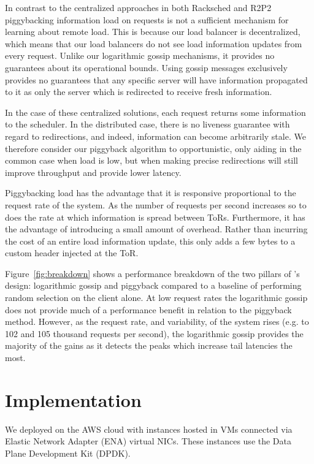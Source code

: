 In contrast to the centralized approaches in both Racksched and
R2P2~\cite{racksched, r2p2} piggybacking information load on requests
is not a sufficient mechanism for learning about remote load. This is
because our load balancer is decentralized, which means that our load
balancers do not see load information updates from every request.
Unlike our logarithmic gossip mechanisms, it provides no guarantees
about its operational bounds. Using gossip messages exclusively
provides no guarantees that any specific server will have information
propagated to it as only the server which is redirected to receive
fresh information.

In the case of these centralized solutions, each request returns some
information to the scheduler. In the distributed case, there is no liveness
guarantee with regard to redirections, and indeed, information can become
arbitrarily stale. We therefore consider our piggyback algorithm to
opportunistic, only aiding in the common case when load is low, but when making
precise redirections will still improve throughput and provide
lower latency.

Piggybacking load has the advantage that it is responsive proportional to the
request rate of the system. 
%
As the number of requests per second increases so to does the rate at which information is spread between ToRs. 
%
Furthermore, it has the advantage of introducing a small amount of overhead. Rather than incurring the cost of an entire load information update, this only adds a few bytes to a custom header injected at the ToR.


Figure~\ref{fig:breakdown} shows a performance breakdown of the two pillars of
\daronpon's design: logarithmic gossip and piggyback compared to a baseline of performing random selection on the client alone. 
%
At low request rates the logarithmic gossip does not provide much of a performance benefit in relation to the piggyback method. 
%
However, as the request rate, and variability, of the system rises (e.g. to 102 and 105
thousand requests per second), the logarithmic gossip provides the majority of
the gains as it detects the peaks which increase tail latencies the most.

\section{Implementation}

We deployed \daronpon on the AWS cloud with instances hosted in VMs connected via Elastic Network Adapter (ENA) virtual NICs. 
%
These instances use the Data Plane Development Kit (DPDK).

